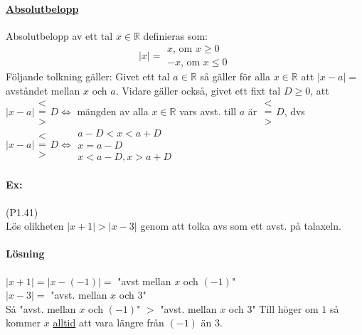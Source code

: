\paragraph{\underline{Absolutbelopp}}
Absolutbelopp av ett tal $x\in\mathbb{R}$ definieras som:
\begin{equation*}
    |x|=\begin{matrix}
        x \text{, om } x\geq 0 \\
        -x \text{, om } x\leq 0
    \end{matrix}
\end{equation*}
Följande tolkning gäller:
Givet ett tal $a\in\mathbb{R}$ så gäller för alla $x\in\mathbb{R}$ att $|x-a|=$ avståndet mellan $x$ och $a$.
Vidare gäller också, givet ett fixt tal $D\geq 0$, att
$|x-a|\begin{matrix}< \\=\\>\end{matrix}D\Leftrightarrow$
mängden av alla $x\in\mathbb{R}$ vars avst. till $a$ är $\begin{matrix}<\\=\\>\end{matrix}D$,
dvs $|x-a|\begin{matrix}
        < \\=\\>
    \end{matrix}D\Leftrightarrow\begin{matrix}
        a-D<x<a+D \\
        x=a-D     \\
        x<a-D,x>a+D
    \end{matrix}$
\paragraph{Ex:} (P1.41)\\
Lös olikheten $|x+1| >|x-3|$ genom att tolka avs som ett avst. på talaxeln.
\paragraph{Lösning}
$|x+1| = |x-(-1)|=$ "avst mellan $x$ och $(-1)$"\\
$|x-3|=$ "avst. mellan $x$ och $3$"\\
Så "avst. mellan $x$ och $(-1)$" $ > $ "avst. mellan $x$ och $3$"
Till höger om $1$ så kommer $x$ \underline{alltid} att vara längre från $(-1)$ än $3$.

